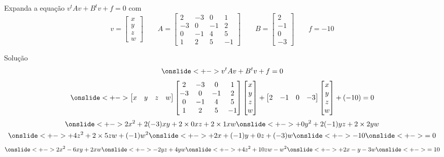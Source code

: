 \begin{question}
  Expanda a equação
  \(
    v^tAv + B^tv + f = 0
  \)
  com
  \[
    v = \begin{bmatrix} x \\ y \\ z \\ w \end{bmatrix}
    \qquad
    A = \begin{bmatrix}
       2 & -3 &  0 &  1 \\
      -3 &  0 & -1 &  2 \\
       0 & -1 &  4 &  5 \\
       1 &  2 &  5 & -1
    \end{bmatrix}
    \qquad
    B = \begin{bmatrix} 2 \\ -1 \\ 0 \\ -3 \end{bmatrix}
    \qquad
    f = -10
  \]
\end{question}

\begin{resolution}{Solução}
  \[
    \onslide<+->{v^tAv + B^tv + f = 0}
  \]
  \[
    \onslide<+->{
    \begin{bmatrix} x & y & z & w \end{bmatrix}
    \begin{bmatrix}
       2 & -3 &  0 &  1 \\
      -3 &  0 & -1 &  2 \\
       0 & -1 &  4 &  5 \\
       1 &  2 &  5 & -1
    \end{bmatrix}
    \begin{bmatrix} x \\ y \\ z \\ w \end{bmatrix}
    +
    \begin{bmatrix} 2 & -1 & 0 & -3 \end{bmatrix}
    \begin{bmatrix} x \\ y \\ z \\ w \end{bmatrix}
    + (-10)
    = 0}
  \]
  \begin{gather*}
    \onslide<+->{2x^2 + 2(-3) xy + 2\times 0xz + 2\times 1xw}
    \onslide<+->{+ 0y^2 + 2(-1)yz + 2\times 2 yw} \\
    \onslide<+->{+ 4z^2 + 2\times 5zw + (-1)w^2}
    \onslide<+->{+ 2x + (-1)y + 0z + (-3)w}
    \onslide<+->{- 10}
    \onslide<+->{= 0}
  \end{gather*}
  \[
    \onslide<+->{2x^2 -6xy + 2xw}
    \onslide<+->{-2yz + 4yw}
    \onslide<+->{+ 4z^2 + 10zw -w^2}
    \onslide<+->{+ 2x -y -3w}
    \onslide<+->{= 10}
  \]
\end{resolution}

\endinput
